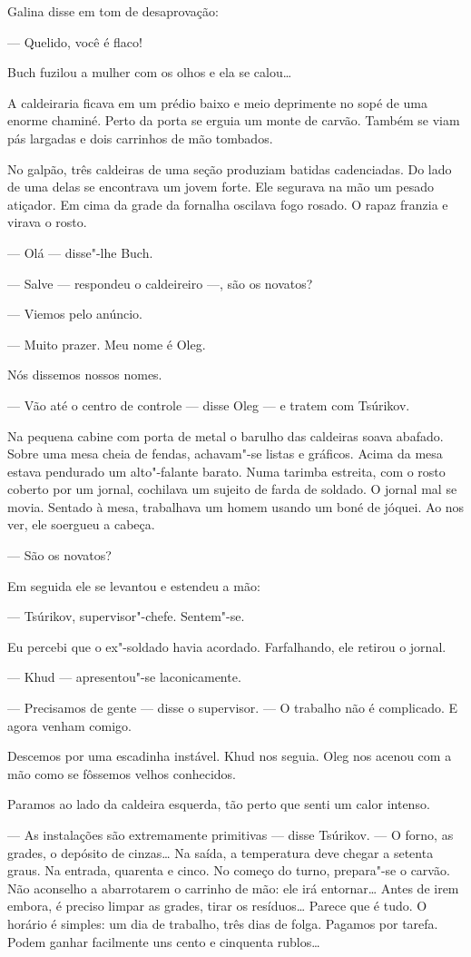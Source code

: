 Galina disse em tom de desaprovação:

--- Quelido, você é flaco!

Buch fuzilou a mulher com os olhos e ela se calou\ldots{}

A caldeiraria ficava em um prédio baixo e meio deprimente no sopé de uma
enorme chaminé. Perto da porta se erguia um monte de carvão. Também se viam
pás largadas e dois carrinhos de mão tombados.

No galpão, três caldeiras de uma seção produziam batidas cadenciadas. Do
lado de uma delas se encontrava um jovem forte. Ele segurava na mão um
pesado atiçador. Em cima da grade da fornalha oscilava fogo
rosado. O rapaz franzia e virava o rosto.

--- Olá --- disse"-lhe Buch.

--- Salve --- respondeu o caldeireiro ---, são os novatos?

--- Viemos pelo anúncio.

--- Muito prazer. Meu nome é Oleg.

Nós dissemos nossos nomes.

--- Vão até o centro de controle --- disse Oleg --- e tratem com
Tsúrikov.

Na pequena cabine com porta de metal o barulho das caldeiras soava
abafado. Sobre uma mesa cheia de fendas, achavam"-se listas e gráficos.
Acima da mesa estava pendurado um alto"-falante barato. Numa tarimba
estreita, com o rosto coberto por um jornal, cochilava um sujeito de
farda de soldado. O jornal mal se movia. Sentado à mesa, trabalhava um
homem usando um boné de jóquei. Ao nos ver, ele soergueu a cabeça.

--- São os novatos?

Em seguida ele se levantou e estendeu a mão:

--- Tsúrikov, supervisor"-chefe. Sentem"-se.

Eu percebi que o ex"-soldado havia acordado. Farfalhando, ele retirou o
jornal.

--- Khud --- apresentou"-se laconicamente.

--- Precisamos de gente --- disse o supervisor. --- O trabalho não é
complicado. E agora venham comigo.

Descemos por uma escadinha instável. Khud nos seguia. Oleg nos acenou
com a mão como se fôssemos velhos conhecidos.

Paramos ao lado da caldeira esquerda, tão perto que senti um calor
intenso.

--- As instalações são extremamente primitivas --- disse Tsúrikov. --- O
forno, as grades, o depósito de cinzas\ldots{} Na saída, a
temperatura deve chegar a setenta graus. Na entrada, quarenta e cinco. No
começo do turno, prepara"-se o carvão. Não aconselho a abarrotarem o
carrinho de mão: ele irá entornar\ldots{} Antes de irem embora, é preciso
limpar as grades, tirar os resíduos\ldots{} Parece que é tudo. O horário é
simples: um dia de trabalho, três dias de folga. Pagamos por tarefa.
Podem ganhar facilmente uns cento e cinquenta rublos\ldots{}

